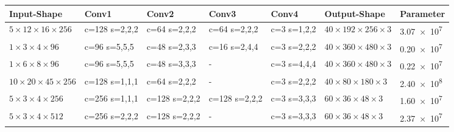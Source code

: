 \begin{table}
    \scriptsize
    \label{table:stable-experiment}
    \begin{tabularx}{\textwidth}{lXXXXll}
        \hline
        Input-Shape & Conv1 & Conv2 & Conv3 & Conv4 & Output-Shape & Parameter \\ \hline
        $5 \times 12 \times 16 \times 256$ & c=128 \newline s=2,2,2 & c=64 \newline s=2,2,2 & c=64 \newline s=2,2,2 & c=3 \newline s=1,2,2 & $40 \times 192 \times 256 \times 3$ & \num{3,07e7} \\ \hline

        $1 \times 3 \times 4 \times 96$ & c=96 \newline s=5,5,5 & c=48 \newline s=2,3,3 & c=16 \newline s=2,4,4 & c=3 \newline s=2,2,2 & $40 \times 360 \times 480 \times 3$ & \num{0,20e7} \\ \hline

        $1 \times 6 \times 8 \times 96$ & c=96 \newline s=5,5,5 & c=48 \newline s=3,3,3 & - & c=3 \newline s=4,4,4 & $40 \times 360 \times 480 \times 3$ & \num{0,22e7} \\ \hline

        $10 \times 20 \times 45 \times 256$ & c=128 \newline s=1,1,1 & c=64 \newline s=2,2,2 & - & c=3 \newline s=2,2,2 & $40 \times 80 \times 180 \times 3$ & \num{2,40e8} \\ \hline

        $5 \times 3 \times 4 \times 256$ & c=256 \newline s=1,1,1 & c=128 \newline s=2,2,2 & c=128 \newline s=2,2,2 & c=3 \newline s=3,3,3 & $60 \times 36 \times 48 \times 3$ & \num{1,60e7} \\ \hline

        $5 \times 3 \times 4 \times 512$ & c=256 \newline s=2,2,2 & c=128 \newline s=2,2,2 & - & c=3 \newline s=3,3,3 & $60 \times 36 \times 48 \times 3$ & \num{2,37e7} \\ \hline


\end{tabularx}
\end{table}
